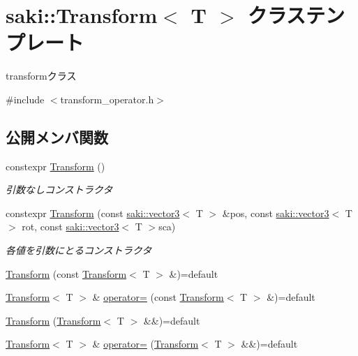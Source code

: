 \hypertarget{classsaki_1_1_transform}{}\section{saki\+:\+:Transform$<$ T $>$ クラステンプレート}
\label{classsaki_1_1_transform}


transformクラス  




{\ttfamily \#include $<$transform\+\_\+operator.\+h$>$}

\subsection*{公開メンバ関数}
\begin{DoxyCompactItemize}
\item 
constexpr \mbox{\hyperlink{classsaki_1_1_transform_abdd7b5f310bccc56b804a2cf21890a35}{Transform}} ()
\begin{DoxyCompactList}\small\item\em 引数なしコンストラクタ \end{DoxyCompactList}\item 
constexpr \mbox{\hyperlink{classsaki_1_1_transform_af4e613f2061daaa30c18aa7b708325a5}{Transform}} (const \mbox{\hyperlink{classsaki_1_1vector3}{saki\+::vector3}}$<$ T $>$ \&pos, const \mbox{\hyperlink{classsaki_1_1vector3}{saki\+::vector3}}$<$ T $>$ rot, const \mbox{\hyperlink{classsaki_1_1vector3}{saki\+::vector3}}$<$ T $>$sca)
\begin{DoxyCompactList}\small\item\em 各値を引数にとるコンストラクタ \end{DoxyCompactList}\item 
\mbox{\hyperlink{classsaki_1_1_transform_a86e4e6b8c8a3387f5659e71b377a9995}{Transform}} (const \mbox{\hyperlink{classsaki_1_1_transform}{Transform}}$<$ T $>$ \&)=default
\item 
\mbox{\hyperlink{classsaki_1_1_transform}{Transform}}$<$ T $>$ \& \mbox{\hyperlink{classsaki_1_1_transform_acfdf423e01196edf631f272400645cfa}{operator=}} (const \mbox{\hyperlink{classsaki_1_1_transform}{Transform}}$<$ T $>$ \&)=default
\item 
\mbox{\hyperlink{classsaki_1_1_transform_a065323d290c8c4edd76855e7b9634ab8}{Transform}} (\mbox{\hyperlink{classsaki_1_1_transform}{Transform}}$<$ T $>$ \&\&)=default
\item 
\mbox{\hyperlink{classsaki_1_1_transform}{Transform}}$<$ T $>$ \& \mbox{\hyperlink{classsaki_1_1_transform_a66ea10234a845d96e63bbb9c2a1050eb}{operator=}} (\mbox{\hyperlink{classsaki_1_1_transform}{Transform}}$<$ T $>$ \&\&)=default

\end{DoxyCompactItemize}
